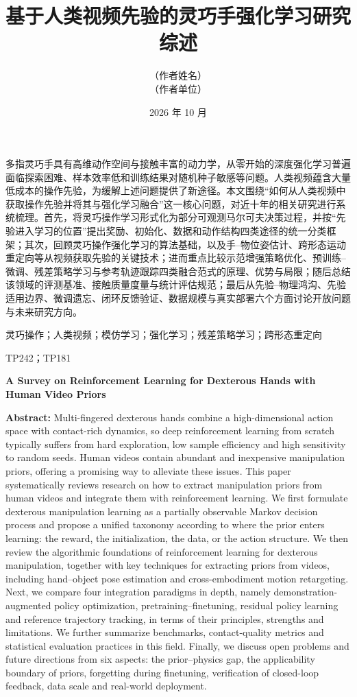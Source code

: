 \documentclass[UTF8,a4paper,zihao=-4]{ctexart}
\title{\heiti 基于人类视频先验的灵巧手强化学习研究综述}
\author{（作者姓名）\\[2pt]{\small （作者单位）}}
\date{2026 年 10 月}
\begin{document}
\maketitle

\begingroup\small
{}多指灵巧手具有高维动作空间与接触丰富的动力学，从零开始的深度强化学习普遍面临探索困难、样本效率低和训练结果对随机种子敏感等问题。人类视频蕴含大量低成本的操作先验，为缓解上述问题提供了新途径。本文围绕“如何从人类视频中获取操作先验并将其与强化学习融合”这一核心问题，对近十年的相关研究进行系统梳理。首先，将灵巧操作学习形式化为部分可观测马尔可夫决策过程，并按“先验进入学习的位置”提出奖励、初始化、数据和动作结构四类途径的统一分类框架；其次，回顾灵巧操作强化学习的算法基础，以及手–物位姿估计、跨形态运动重定向等从视频获取先验的关键技术；进而重点比较示范增强策略优化、预训练–微调、残差策略学习与参考轨迹跟踪四类融合范式的原理、优势与局限；随后总结该领域的评测基准、接触质量度量与统计评估规范；最后从先验–物理鸿沟、先验适用边界、微调遗忘、闭环反馈验证、数据规模与真实部署六个方面讨论开放问题与未来研究方向。

\smallskip
{}灵巧操作；人类视频；模仿学习；强化学习；残差策略学习；跨形态重定向

TP242；TP181

\bigskip
\begin{center}
  {\large\bfseries A Survey on Reinforcement Learning for Dexterous Hands with Human Video Priors}
\end{center}

\noindent\textbf{Abstract:} Multi-fingered dexterous hands combine a high-dimensional action space with contact-rich dynamics, so deep reinforcement learning from scratch typically suffers from hard exploration, low sample efficiency and high sensitivity to random seeds. Human videos contain abundant and inexpensive manipulation priors, offering a promising way to alleviate these issues. This paper systematically reviews research on how to extract manipulation priors from human videos and integrate them with reinforcement learning. We first formulate dexterous manipulation learning as a partially observable Markov decision process and propose a unified taxonomy according to where the prior enters learning: the reward, the initialization, the data, or the action structure. We then review the algorithmic foundations of reinforcement learning for dexterous manipulation, together with key techniques for extracting priors from videos, including hand--object pose estimation and cross-embodiment motion retargeting. Next, we compare four integration paradigms in depth, namely demonstration-augmented policy optimization, pretraining--finetuning, residual policy learning and reference trajectory tracking, in terms of their principles, strengths and limitations. We further summarize benchmarks, contact-quality metrics and statistical evaluation practices in this field. Finally, we discuss open problems and future directions from six aspects: the prior--physics gap, the applicability boundary of priors, forgetting during finetuning, verification of closed-loop feedback, data scale and real-world deployment.
\end{document}

